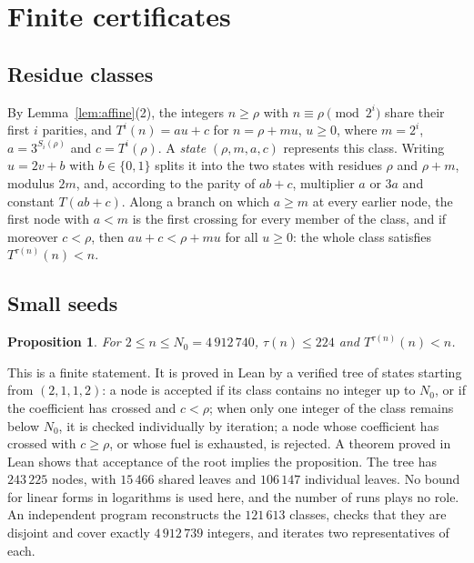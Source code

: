 \documentclass[11pt]{amsart}
\newtheorem{proposition}[theorem]{Proposition}
\theoremstyle{definition}
\theoremstyle{remark}
\newcommand{\Nzero}{4\,912\,740}
\begin{document}
\section{Finite certificates}\label{sec:certificates}

\subsection{Residue classes}
By Lemma~\ref{lem:affine}(2), the integers $n\ge\rho$ with $n\equiv\rho\pmod{2^{i}}$ share their first $i$ parities, and $T^{i}(n)=au+c$ for $n=\rho+mu$, $u\ge0$, where $m=2^{i}$, $a=3^{S_i(\rho)}$ and $c=T^{i}(\rho)$. A \emph{state} $(\rho,m,a,c)$ represents this class. Writing $u=2v+b$ with $b\in\{0,1\}$ splits it into the two states with residues $\rho$ and $\rho+m$, modulus $2m$, and, according to the parity of $ab+c$, multiplier $a$ or $3a$ and constant $T(ab+c)$. Along a branch on which $a\ge m$ at every earlier node, the first node with $a<m$ is the first crossing for every member of the class, and if moreover $c<\rho$, then $au+c<\rho+mu$ for all $u\ge0$: the whole class satisfies $T^{\tau(n)}(n)<n$.

\subsection{Small seeds}

\begin{proposition}\label{prop:small}
For $2\le n\le N_0=\Nzero$, $\tau(n)\le224$ and $T^{\tau(n)}(n)<n$.
\end{proposition}

This is a finite statement. It is proved in Lean by a verified tree of states starting from $(2,1,1,2)$: a node is accepted if its class contains no integer up to $N_0$, or if the coefficient has crossed and $c<\rho$; when only one integer of the class remains below $N_0$, it is checked individually by iteration; a node whose coefficient has crossed with $c\ge\rho$, or whose fuel is exhausted, is rejected. A theorem proved in Lean shows that acceptance of the root implies the proposition. The tree has $243\,225$ nodes, with $15\,466$ shared leaves and $106\,147$ individual leaves. No bound for linear forms in logarithms is used here, and the number of runs plays no role. An independent program reconstructs the $121\,613$ classes, checks that they are disjoint and cover exactly $4\,912\,739$ integers, and iterates two representatives of each.
\end{document}
